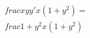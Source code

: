 \documentclass[preview]{standalone}
\begin{document}
\begin{align*}
\quad\\frac{xyy'}{x(1+y^2)}=\quad\\frac{1+y^2}{x(1+y^2)}
\end{align*}
\end{document}
